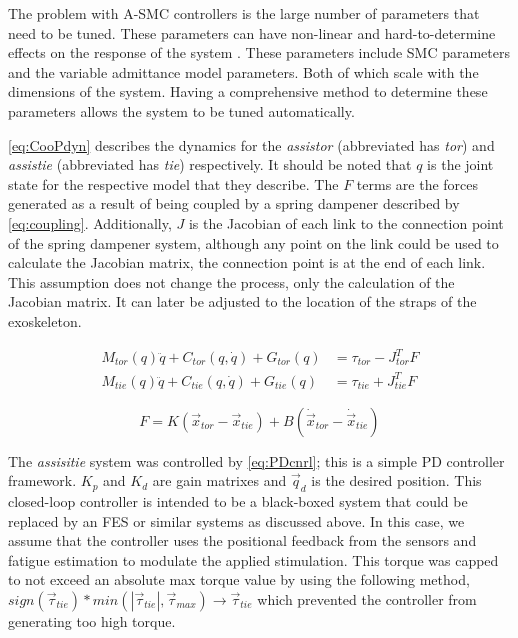 The problem with A-SMC controllers is the large number of parameters that need to be tuned. These parameters can have non-linear and hard-to-determine effects on the response of the system \cite{slotine1983tracking}. These parameters include SMC parameters and the variable admittance model parameters. Both of which scale with the dimensions of the system. Having a comprehensive method to determine these parameters allows the system to be tuned automatically.  

\autoref{eq:CooPdyn} describes the dynamics for the \textit{assistor} (abbreviated has \textit{tor}) and \textit{assistie} (abbreviated has \textit{tie}) respectively.  It should be noted that $q$ is the joint state for the respective model that they describe. The $F$ terms are the forces generated as a result of being coupled by a spring dampener described by \autoref{eq:coupling}. Additionally, $J$ is the Jacobian of each link to the connection point of the spring dampener system, although any point on the link could be used to calculate the Jacobian matrix, the connection point is at the end of each link. This assumption does not change the process, only the calculation of the Jacobian matrix. It can later be adjusted to the location of the straps of the exoskeleton.

\begin{equation} 
\begin{aligned}
    M_{tor}(q) \ddot{q} + C_{tor} (q,\dot{q}) + G_{tor}(q) &= \tau_{tor} - J_{tor}^T F \\
    M_{tie}(q) \ddot{q} + C_{tie} (q,\dot{q}) + G_{tie}(q) &= \tau_{tie} + J_{tie}^T F
\end{aligned}
    \label{eq:CooPdyn}
\end{equation}

\begin{equation}
    F = K ( \vec{x}_{tor} - \vec{x}_{tie} ) + B (\dot{ \vec{x}}_{tor} - \dot{ \vec{x}}_{tie} ) 
    \label{eq:coupling}
\end{equation}


The \textit{assisitie} system was controlled by \autoref{eq:PDcnrl}; this is a simple PD controller framework. $K_p$ and $K_d$ are gain matrixes and $\vec{q}_d$ is the desired position. This closed-loop controller is intended to be a black-boxed system that could be replaced by an FES or similar systems as discussed above. In this case, we assume that the controller uses the positional feedback from the sensors and fatigue estimation to modulate the applied stimulation. This torque was capped to not exceed an absolute max torque value by using the following method, $ sign(\vec{\tau}_{tie})* min( | \vec{\tau}_{tie}|, \vec{\tau}_{max}) \rightarrow \vec{\tau}_{tie} $ which prevented the controller from generating too high torque. 

